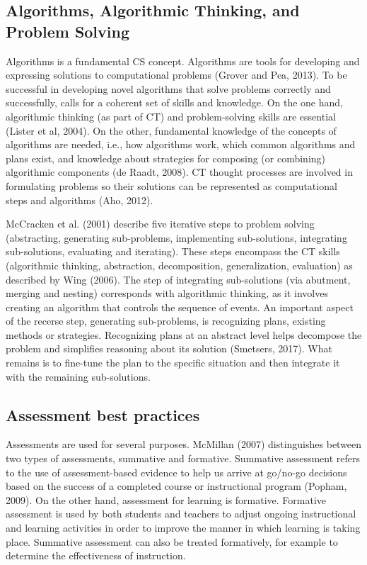 \subsection{Algorithms, Algorithmic Thinking, and Problem Solving}

Algorithms is a fundamental CS concept. Algorithms are tools for developing and expressing solutions to computational problems (Grover and Pea, 2013). To be successful in developing novel algorithms that solve problems correctly and successfully, calls for a coherent set of skills and knowledge.
On the one hand, algorithmic thinking (as part of CT) and problem-solving skills are essential (Lister et al, 2004). On the other, fundamental knowledge of the concepts of algorithms are needed, i.e., how algorithms work, which common algorithms and plans exist, and knowledge about strategies for composing (or combining) algorithmic components (de Raadt, 2008). CT thought processes are involved in formulating problems so their solutions can be represented as computational steps and algorithms (Aho, 2012).





McCracken et al. (2001) describe five iterative steps to problem solving (abstracting, generating sub-problems, implementing sub-solutions, integrating sub-solutions, evaluating and iterating). These steps encompass the CT skills (algorithmic thinking, abstraction, decomposition, generalization, evaluation) as described by Wing (2006). The step of integrating sub-solutions (via abutment, merging and nesting) corresponds with algorithmic thinking, as it involves creating an algorithm that controls the sequence of events. An important aspect of the recerse step, generating sub-problems, is recognizing plans, existing methods or strategies. Recognizing plans at an abstract level helps decompose the problem and simplifies reasoning about its solution (Smetsers, 2017). What remains is to fine-tune the plan to the specific situation and then integrate it with the remaining sub-solutions.


\subsection{Assessment best practices}


Assessments are used for several purposes. McMillan (2007) distinguishes between two types of assessments, summative and formative. Summative assessment refers to the use of assessment-based evidence to help us arrive at go/no-go decisions based on the success of a completed course or instructional program (Popham, 2009). On the other hand, assessment for learning is formative. Formative assessment is used by both students and teachers to adjust ongoing instructional and learning activities in order to improve the manner in which learning is taking place. Summative assessment can also be treated formatively, for example to determine the effectiveness of instruction.




